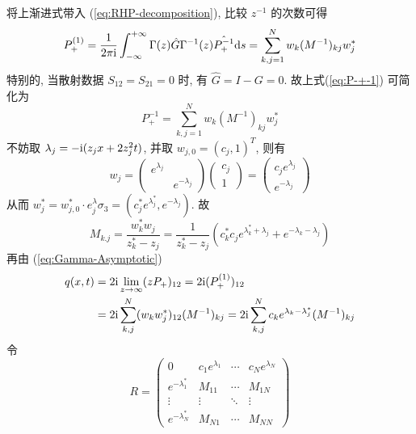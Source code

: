 将上渐进式带入 (\ref{eq:RHP-decomposition}), 比较 $ z^{-1} $ 的次数可得
\begin{equation}
  P_{+}^{(1)} = \frac{1}{2 \pi \mathrm{i}} \int_{-\infty}^{+\infty} \Gamma(z) \hat{G} \Gamma^{-1}(z) \hat{P_{+}^{-1}} \mathrm{d} s = \sum_{k,j = 1}^{N} w_{k} (M^{-1})_{kj} w_{j}^{*} \label{eq:P-+-1}
\end{equation}
特别的, 当散射数据 $ S_{12} = S_{21} = 0 $ 时, 有 $ \hat{G} = I - G = 0 $. 故上式(\ref{eq:P-+-1}) 可简化为
\begin{equation}
  P_{+}^{-1} = \sum_{k,j = 1}^{N} w_{k}(M^{-1})_{kj} w_{j}^{*}
\end{equation}
不妨取 $ \lambda_{j} = - \mathrm{i} (z_{j}x + 2 z_{j}^{2} t) $, 并取 $ w_{j,0} = (c_{j},1)^{T} $, 则有
\begin{equation}
  w_{j} = \begin{pmatrix}
    e^{\lambda_{j}} & \\ & e^{-\lambda_{j}}
  \end{pmatrix} \begin{pmatrix}
    c_{j} \\ 1
  \end{pmatrix} = \begin{pmatrix}
    c_{j} e^{\lambda_{j}} \\ e^{-\lambda_{j}}
  \end{pmatrix}
\end{equation}
从而 $ w_{j}^{*} = w_{j,0}^{*} \cdot e^\lambda_{j} \sigma_{3} = (c_{j}^{*}e^{\lambda_{j}^{*}}, e^{-\lambda_{j}})$. 故
\begin{equation}
  M_{k.j} = \frac{w_{k}^{*}w_{j}}{z_{k}^{*}- z_{j}} = \frac{1}{z_{k}^{*} - z_{j}} (c_{k}^{*}c_{j} e^{\lambda_{k}^{*} + \lambda_{j}} + e^{-\lambda_{k} - \lambda_{j}})
\end{equation}
再由 (\ref{eq:Gamma-Asymptotic}) 
\begin{equation}
  \begin{aligned}
    q(x,t) &= 2 \mathrm{i} \lim_{z \to \infty} (zP_{+})_{12} = 2 \mathrm{i} (P_{+}^{(1)})_{12}\\
     &= 2 \mathrm{i} \sum_{k,j}^{N}(w_{k}w_{j}^{*})_{12}(M^{-1})_{kj} = 2 \mathrm{i} \sum_{k,j}^{N} c_{k}e^{\lambda_{k} - \lambda_{j}^{*}}(M^{-1})_{kj} \label{eq:NLS-N-soliton}
  \end{aligned}
\end{equation}
令
\begin{equation}
  R = \begin{pmatrix}
    0 & c_{1}e^{\lambda_{1}} & \cdots & c_{N}e^{\lambda_{N}} \\
    e^{-\lambda_{1}^{*}} & M_{11} & \cdots & M_{1N} \\
    \vdots & \vdots & \ddots & \vdots \\
    e^{-\lambda_{N}^{*}} &  M_{N1} & \cdots & M_{NN}
  \end{pmatrix}
\end{equation}
